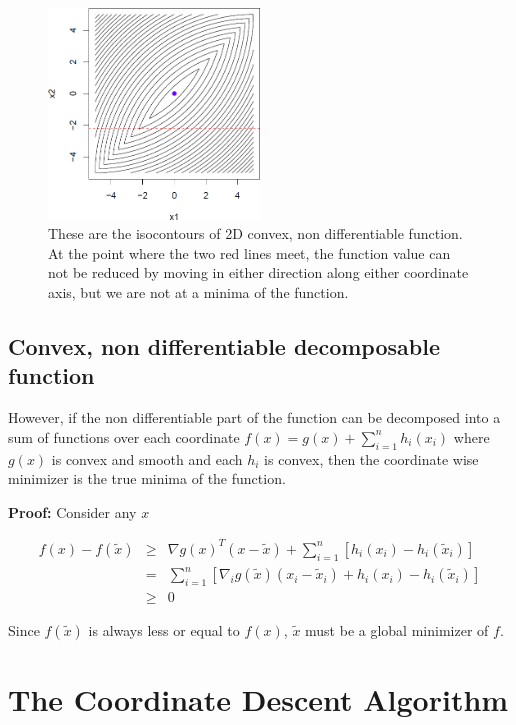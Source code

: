 \documentclass[twoside]{article}
\begin{document}
\begin{figure}[h!]
\label{isocontours}
\centering
\includegraphics[width=0.5\textwidth]{images/isocontours.png}
\caption{These are the isocontours of 2D convex, non differentiable function. At the point where the two red lines meet, the function value can not be reduced by moving in either direction along either coordinate axis, but we are not at a minima of the function.}
\end{figure}

\subsection{Convex, non differentiable decomposable function}

However, if the non differentiable part of the function can be decomposed into a sum of functions over each coordinate $f(x) = g(x) + \sum_{i=1}^{n} h_i(x_i)$ where $g(x)$ is convex and smooth and each $h_i$ is convex, then the coordinate wise minimizer is the true minima of the function.

\textbf{Proof:} Consider any $x$

\begin{eqnarray}
f(x) - f(\tilde{x}) &\geq & \nabla g(x)^T(x-\tilde{x}) + \displaystyle\sum_{i=1}^{n}[h_i(x_i)-h_i(\tilde{x}_i)]\\
                    & = & \displaystyle\sum_{i=1}^n[\nabla_{i}g(\tilde{x})(x_i-\tilde{x}_i)+h_i(x_i)-h_i(\tilde{x}_i)]\\
                    & \geq & 0
\end{eqnarray}

Since $f(\tilde{x})$ is always less or equal to $f(x)$, $\tilde{x}$ must be a global minimizer of $f$.

\section{The Coordinate Descent Algorithm}
\end{document}
